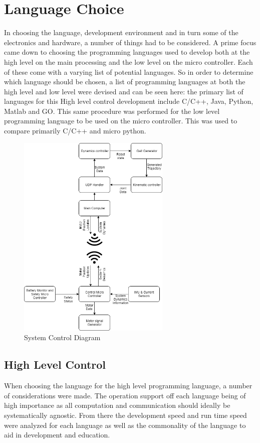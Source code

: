 \documentclass[12pt]{report}
\begin{document}
\section{Language Choice}
In choosing the language, development environment and in turn some of the electronics and hardware, a number of things had to be considered. A prime focus came down to choosing the programming languages used to develop both at the high level on the main processing and the low level on the micro controller. Each of these come with a varying list of potential languages. So in order to determine which language should be chosen, a list of programming languages at both the high level and low level were devised and can be seen here: the primary list of languages for this High level control development include C/C++, Java, Python, Matlab and GO. This same procedure was performed for the low level programming language to be used on the micro controller. This was used to compare primarily C/C++ and micro python.  
    \begin{figure}[H]
	\centering
      \includegraphics[width=0.65\textwidth]{Images/SmallKatControllerDiagram.png}
  	\caption{System Control Diagram}
  	\label{fig:controStructure}
\end{figure}
\subsection{High Level Control}
When choosing the language for the high level programming language, a number of considerations were made. The operation support off each language being of high importance as all computation and communication should ideally be systematically agnostic. From there the development speed and run time speed were analyzed for each language as well as the commonality of the language to aid in development and education. 
\end{document}
